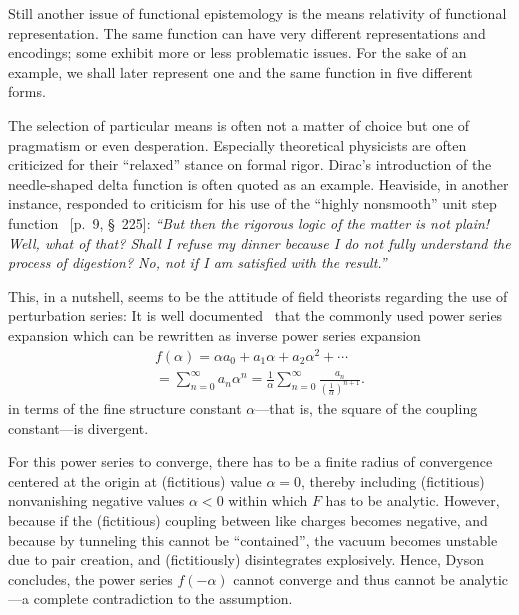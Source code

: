 \documentclass[axioms,article,accept,oneauthor,pdftex]{Definitions/mdpi}
\begin{document}
Still another issue of functional epistemology is the means relativity of functional representation.
The same function can have very different representations and encodings; some exhibit more or less problematic issues.
For the sake of an example, we shall later represent one and the same function in five different forms.



The selection of particular means is often not a matter of choice but one of pragmatism or even desperation.
Especially theoretical physicists are often criticized for their ``relaxed'' stance on formal rigor.
Dirac's introduction of the needle-shaped delta function is often quoted as an example.
Heaviside, in another instance, responded to criticism for his use of the ``highly nonsmooth''
unit step function \cite{heaviside-EMT}~[p.~9, \S~225]:
{\em ``But then the
rigorous logic of the matter is not plain! Well, what of that?
Shall I refuse my dinner because I do not fully understand the
process of digestion? No, not if I am satisfied with the result.''}


This, in a nutshell, seems to be the attitude of field theorists
regarding the use of perturbation series:
It is well documented~\cite{PhysRev.85.631,LeGuillou-Zinn-Justin,Vainshtein1964-2002}
that the commonly used power series expansion
which can be rewritten as inverse power series expansion
\begin{equation}
\begin{split}
f( \alpha ) = \alpha a_0+a_1\alpha + a_2\alpha^2+ \cdots \\
= \sum_{n=0}^\infty a_n \alpha^n
= \frac{1}{\alpha}  \sum_{n=0}^\infty \frac{a_n}{\left(\frac{1}{\alpha}\right)^{n+1}}
.
\end{split}
\label{2022-nul-Dyson}
\end{equation}
in terms of the fine structure constant $\alpha$---that is, the square of the coupling constant---is divergent.

For this power series to converge, there has to be a finite radius of convergence
centered at the origin at (fictitious) value $\alpha=0$,
thereby including (fictitious) nonvanishing negative values $\alpha < 0$
within which $F$ has to be analytic.
However, because if the (fictitious) coupling between like charges becomes negative, and because by tunneling this cannot be ``contained'',
the vacuum becomes unstable due to pair creation, and (fictitiously) disintegrates explosively.
Hence, Dyson concludes,
the power series $f(-\alpha)$ cannot converge and thus cannot be analytic---a complete contradiction to the assumption.
\end{document}
